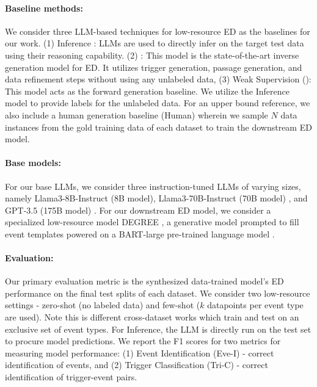 \paragraph{Baseline methods:}
We consider three LLM-based techniques for low-resource ED as the baselines for our work.
(1) Inference \cite{DBLP:journals/corr/abs-2303-03836}: LLMs are used to directly infer on the target test data using their reasoning capability.
(2) \starName{} \cite{star}: This model is the state-of-the-art inverse generation model for ED. It utilizes trigger generation, passage generation, and data refinement steps without using any unlabeled data,
(3) Weak Supervision (\extracttrain): This model acts as the forward generation baseline. We utilize the Inference model to provide labels for the unlabeled data.
For an upper bound reference, we also include a human generation baseline (Human) wherein we sample $N$ data instances from the gold training data of each dataset to train the downstream ED model.

\paragraph{Base models:}
For our base LLMs, we consider three instruction-tuned LLMs of varying sizes, namely Llama3-8B-Instruct (8B model), Llama3-70B-Instruct (70B model) \cite{llama3}, and GPT-3.5 (175B model) \cite{gpt}.
For our downstream ED model, we consider a specialized low-resource model DEGREE \cite{hsu-etal-2022-degree}, a generative model prompted to fill event templates powered on a BART-large pre-trained language model \cite{lewis-etal-2020-bart}.

\paragraph{Evaluation:}
Our primary evaluation metric is the synthesized data-trained model's ED performance on the final test splits of each dataset.
We consider two low-resource settings - zero-shot (no labeled data) and few-shot ($k$ datapoints per event type are used).
Note this is different cross-dataset works \cite{cai-etal-2024-improving-event} which train and test on an exclusive set of event types.
For Inference, the LLM is directly run on the test set to procure model predictions.
We report the F1 scores for two metrics \cite{ahn-2006-stages} for measuring model performance:
(1) Event Identification (Eve-I) - correct identification of events, and
(2) Trigger Classification (Tri-C) - correct identification of trigger-event pairs.

